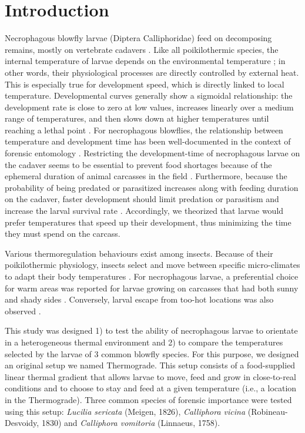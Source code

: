 \clearpage

	\section{Introduction}
Necrophagous blowfly larvae (Diptera Calliphoridae) feed on decomposing remains, mostly on vertebrate cadavers \cite{szpila_key_2009}. Like all poikilothermic species, the internal temperature of larvae depends on the environmental temperature \cite{chapman_insects:_1998}; in other words, their physiological processes are directly controlled by external heat. This is especially true for development speed, which is directly linked to local temperature. Developmental curves generally show a sigmoidal relationship: the development rate is close to zero at low values, increases linearly over a medium range of temperatures, and then slows down at higher temperatures until reaching a lethal point \cite{dent_quantifying_1997}. For necrophagous blowflies, the relationship between temperature and development time has been well-documented in the context of forensic entomology \citep{grassberger_effect_2001,swiger_effects_2007}. Restricting the development-time of necrophagous larvae on the cadaver seems to be essential to prevent food shortages because of the ephemeral duration of animal carcasses in the field \cite{payne_summer_1965}. Furthermore, because the probability of being predated or parasitized increases along with feeding duration on the cadaver, faster development should limit predation or parasitism and increase the larval survival rate \cite{roe_development_2015}. Accordingly, we theorized that larvae would prefer temperatures that speed up their development, thus minimizing the time they must spend on the carcass.  

Various thermoregulation behaviours exist among insects. Because of their poikilothermic physiology, insects select and move between specific micro-climates to adapt their body temperatures \cite{may_insect_1979}. For necrophagous larvae, a preferential choice for warm areas was reported for larvae growing on carcasses that had both sunny and shady sides \cite{sharanowski_insect_2008}. Conversely, larval escape from too-hot locations was also observed \citep{richards_thermal_2009,charabidze_larval-mass_2011}. 

This study was designed 1) to test the ability of necrophagous larvae to orientate in a heterogeneous thermal environment and 2) to compare the temperatures selected by the larvae of 3 common blowfly species. For this purpose, we designed an original setup we named Thermograde. This setup consists of a food-supplied linear thermal gradient that allows larvae to move, feed and grow in close-to-real conditions and to choose to stay and feed at a given temperature (i.e., a location in the Thermograde). Three common species of forensic importance were tested using this setup: \textit{Lucilia sericata} (Meigen, 1826), \textit{Calliphora vicina} (Robineau-Desvoidy, 1830) and \textit{Calliphora vomitoria} (Linnaeus, 1758). 

